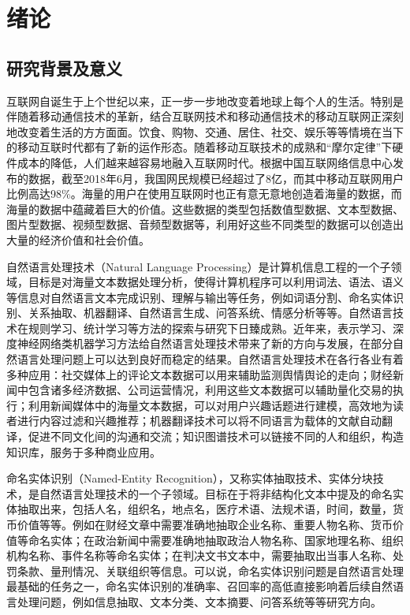 \documentclass[winfonts,master,oneside,nobackinfo]{njuthesis}
\begin{document}
\chapter{绪论}\label{chapter_introduction}
\section{研究背景及意义}
互联网自诞生于上个世纪以来，正一步一步地改变着地球上每个人的生活。特别是伴随着移动通信技术的革新，结合互联网技术和移动通信技术的移动互联网正深刻地改变着生活的方方面面。饮食、购物、交通、居住、社交、娱乐等等情境在当下的移动互联时代都有了新的运作形态。随着移动互联技术的成熟和“摩尔定律”下硬件成本的降低，人们越来越容易地融入互联网时代。根据中国互联网络信息中心发布的数据，截至2018年6月，我国网民规模已经超过了8亿，而其中移动互联网用户比例高达98\%。海量的用户在使用互联网时也正有意无意地创造着海量的数据，而海量的数据中蕴藏着巨大的价值。这些数据的类型包括数值型数据、文本型数据、图片型数据、视频型数据、音频型数据等，利用好这些不同类型的数据可以创造出大量的经济价值和社会价值。

自然语言处理技术（Natural Language Processing）是计算机信息工程的一个子领域，目标是对海量文本数据处理分析，使得计算机程序可以利用词法、语法、语义等信息对自然语言文本完成识别、理解与输出等任务，例如词语分割、命名实体识别、关系抽取、机器翻译、自然语言生成、问答系统、情感分析等等。自然语言技术在规则学习、统计学习等方法的探索与研究下日臻成熟。近年来，表示学习、深度神经网络类机器学习方法给自然语言处理技术带来了新的方向与发展，在部分自然语言处理问题上可以达到良好而稳定的结果。自然语言处理技术在各行各业有着多种应用：社交媒体上的评论文本数据可以用来辅助监测舆情舆论的走向；财经新闻中包含诸多经济数据、公司运营情况，利用这些文本数据可以辅助量化交易的执行；利用新闻媒体中的海量文本数据，可以对用户兴趣话题进行建模，高效地为读者进行内容过滤和兴趣推荐；机器翻译技术可以将不同语言为载体的文献自动翻译，促进不同文化间的沟通和交流；知识图谱技术可以链接不同的人和组织，构造知识库，服务于多种商业应用。

命名实体识别（Named-Entity Recognition），又称实体抽取技术、实体分块技术，是自然语言处理技术的一个子领域。目标在于将非结构化文本中提及的命名实体抽取出来，包括人名，组织名，地点名，医疗术语、法规术语，时间，数量，货币价值等等。例如在财经文章中需要准确地抽取企业名称、重要人物名称、货币价值等命名实体；在政治新闻中需要准确地抽取政治人物名称、国家地理名称、组织机构名称、事件名称等命名实体；在判决文书文本中，需要抽取出当事人名称、处罚条款、量刑情况、关联组织等信息。可以说，命名实体识别问题是自然语言处理最基础的任务之一，命名实体识别的准确率、召回率的高低直接影响着后续自然语言处理问题，例如信息抽取、文本分类、文本摘要、问答系统等等研究方向。
\end{document}
